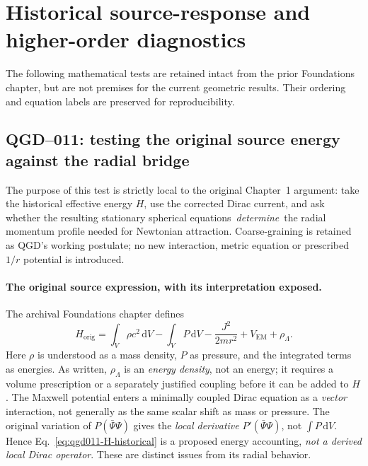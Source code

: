\documentclass[11pt,a4paper]{article}
\newcommand{\dd}{\mathrm d}
\begin{document}
\appendix
\section{Historical source-response and higher-order diagnostics}\label{app:qgd-historical-source}
The following mathematical tests are retained intact from the prior Foundations chapter, but are not premises for the current geometric results. Their ordering and equation labels are preserved for reproducibility.

\subsection{QGD--011: testing the original source energy against the radial bridge}\label{sec:qgd011-original-H}
The purpose of this test is strictly local to the original Chapter~1 argument: take the historical effective energy $H$, use the corrected Dirac current, and ask whether the resulting stationary spherical equations \,\emph{determine}\, the radial momentum profile needed for Newtonian attraction.  Coarse-graining is retained as QGD's working postulate; no new interaction, metric equation or prescribed $1/r$ potential is introduced.

\paragraph{The original source expression, with its interpretation exposed.}
The archival Foundations chapter defines
\begin{equation}\label{eq:qgd011-H-historical}
 H_{\mathrm{orig}}=\int_V\rho c^2\,\dd V-\int_V P\,\dd V
 -\frac{J^2}{2mr^2}+V_{\mathrm{EM}}+\rho_\Lambda.
\end{equation}
Here $\rho$ is understood as a mass density, $P$ as pressure, and the integrated terms as energies. As written, $\rho_\Lambda$ is an \emph{energy density}, not an energy; it requires a volume prescription or a separately justified coupling before it can be added to $H$.  The Maxwell potential enters a minimally coupled Dirac equation as a \emph{vector} interaction, not generally as the same scalar shift as mass or pressure.  The original variation of $P(\bar\Psi\Psi)$ gives the \emph{local derivative} $P'(\bar\Psi\Psi)$, not $\int P\,\dd V$. Hence Eq.~\eqref{eq:qgd011-H-historical} is a proposed energy accounting, \emph{not a derived local Dirac operator}. These are distinct issues from its radial behavior.
\end{document}
